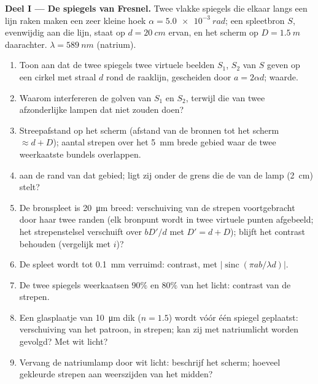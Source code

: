 \begin{problem}
\label{pb:b2:two-wave-interference:1}

\medskip
\noindent\textbf{Deel I --- De spiegels van Fresnel.}
Twee vlakke spiegels die elkaar langs een lijn raken maken een zeer kleine
hoek $\alpha =
\qty{5.0e-3}{rad}$; een spleetbron $S$, evenwijdig aan die
lijn, staat op $d =
\qty{20}{cm}$ ervan, en het scherm op $D = \qty{1.5}{m}$
daarachter. $\lambda =
\qty{589}{nm}$ (natrium).
\begin{enumerate}
  \item Toon aan dat de twee spiegels twee virtuele beelden $S_1$, $S_2$ van
        $S$ geven op een cirkel met straal $d$ rond de raaklijn,
        gescheiden door $a = 2\alpha d$; waarde.
  \item Waarom interfereren de golven van $S_1$ en $S_2$, terwijl die van
        twee afzonderlijke lampen dat niet zouden doen?
  \item Streepafstand op het scherm (afstand van de bronnen tot het
        scherm $\approx d + D$); aantal strepen over het
        \qty{5}{mm} brede gebied waar de twee weerkaatste bundels overlappen.
  \item {} aan de rand van dat gebied; ligt zij onder
        de grens die de  van de lamp (\qty{2}{cm}) stelt?
  \item De bronspleet is \qty{20}{\micro m} breed: verschuiving van de strepen
        voortgebracht door haar twee randen (elk bronpunt wordt in twee
        virtuele punten afgebeeld; het strepenstelsel verschuift over
        $bD'/d$ met $D' =
        d + D$); blijft het contrast behouden
        (vergelijk met $i$)?
  \item De spleet wordt tot \qty{0.1}{mm} verruimd: contrast, met
        $|\operatorname{sinc}(\pi ab/\lambda d)|$.
  \item De twee spiegels weerkaatsen $90\%$ en $80\%$ van het licht: contrast
        van de strepen.
  \item Een glasplaatje van \qty{10}{\micro m} dik ($n = 1.5$) wordt vóór
        één spiegel geplaatst: verschuiving van het patroon, in strepen; kan zij
        met natriumlicht worden gevolgd? Met wit licht?
  \item Vervang de natriumlamp door wit licht: beschrijf het scherm;
        hoeveel gekleurde strepen aan weerszijden van het midden?
\end{enumerate}


\end{problem}
